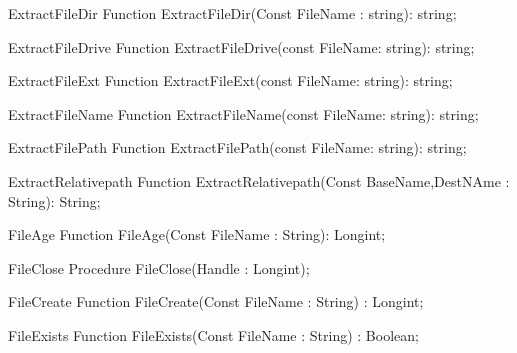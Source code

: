  
\begin{function}{ExtractFileDir}
\Declaration
Function ExtractFileDir(Const FileName : string): string;
\Description
\Errors
\SeeAlso
\end{function}

 
\begin{function}{ExtractFileDrive}
\Declaration
Function ExtractFileDrive(const FileName: string): string;
\Description
\Errors
\SeeAlso
\end{function}

 
\begin{function}{ExtractFileExt}
\Declaration
Function ExtractFileExt(const FileName: string): string; 
\Description
\Errors
\SeeAlso
\end{function}

 
\begin{function}{ExtractFileName}
\Declaration
Function ExtractFileName(const FileName: string): string;
\Description
\Errors
\SeeAlso
\end{function}

 
\begin{function}{ExtractFilePath}
\Declaration
Function ExtractFilePath(const FileName: string): string;
\Description
\Errors
\SeeAlso
\end{function}

 
\begin{function}{ExtractRelativepath}
\Declaration
Function ExtractRelativepath(Const BaseName,DestNAme : String): String;
\Description
\Errors
\SeeAlso
\end{function}

 
\begin{function}{FileAge}
\Declaration
Function FileAge(Const FileName : String): Longint;
\Description
\Errors
\SeeAlso
\end{function}

 
\begin{procedure}{FileClose}
\Declaration
Procedure FileClose(Handle : Longint);
\Description
\Errors
\SeeAlso
\end{procedure}

 
\begin{function}{FileCreate}
\Declaration
Function FileCreate(Const FileName : String) : Longint;
\Description
\Errors
\SeeAlso
\end{function}

 
\begin{function}{FileExists}
\Declaration
Function FileExists(Const FileName : String) : Boolean;
\Description
\Errors
\SeeAlso
\end{function}

